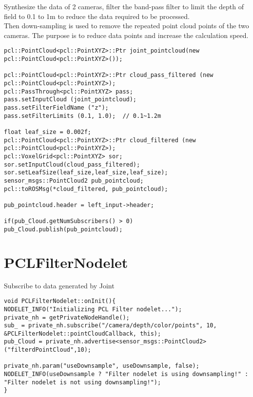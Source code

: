 Synthesize the data of 2 cameras, filter the band-pass filter to limit the depth of field to 0.1 to 1m to reduce the data required to be processed.\\
Then down-sampling is used to remove the repeated point cloud points of the two cameras. The purpose is to reduce data points and increase the calculation speed.
\begin{lstlisting}[caption={}] pcl::PointCloud<pcl::PointXYZ>::Ptr joint_pointcloud(new pcl::PointCloud<pcl::PointXYZ>());

pcl::PointCloud<pcl::PointXYZ>::Ptr cloud_pass_filtered (new pcl::PointCloud<pcl::PointXYZ>);
pcl::PassThrough<pcl::PointXYZ> pass;
pass.setInputCloud (joint_pointcloud);
pass.setFilterFieldName ("z");
pass.setFilterLimits (0.1, 1.0);  // 0.1~1.2m 

float leaf_size = 0.002f;
pcl::PointCloud<pcl::PointXYZ>::Ptr cloud_filtered (new pcl::PointCloud<pcl::PointXYZ>);
pcl::VoxelGrid<pcl::PointXYZ> sor;    
sor.setInputCloud(cloud_pass_filtered);            
sor.setLeafSize(leaf_size,leaf_size,leaf_size);           
sensor_msgs::PointCloud2 pub_pointcloud;
pcl::toROSMsg(*cloud_filtered, pub_pointcloud);

pub_pointcloud.header = left_input->header;

if(pub_Cloud.getNumSubscribers() > 0)
pub_Cloud.publish(pub_pointcloud);
\end{lstlisting}

\section{PCLFilterNodelet}
Subscribe to data generated by Joint
\begin{lstlisting}[caption={}]
void PCLFilterNodelet::onInit(){
NODELET_INFO("Initializing PCL Filter nodelet...");
private_nh = getPrivateNodeHandle();
sub_ = private_nh.subscribe("/camera/depth/color/points", 10, &PCLFilterNodelet::pointCloudCallback, this);
pub_Cloud = private_nh.advertise<sensor_msgs::PointCloud2>("filterdPointCloud",10);

private_nh.param("useDownsample", useDownsample, false);
NODELET_INFO(useDownsample ? "Filter nodelet is using downsampling!" : "Filter nodelet is not using downsampling!");
}
\end{lstlisting}



